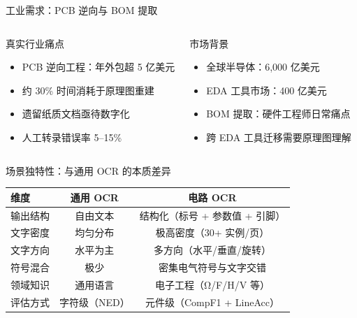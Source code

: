\documentclass[10pt,aspectratio=169,table]{beamer}
\begin{document}
\begin{frame}{工业需求：PCB 逆向与 BOM 提取}
  \begin{columns}[T]
      \begin{block}{真实行业痛点}
        \footnotesize
        \begin{itemize}
          \item PCB 逆向工程：年外包超 5 亿美元
          \item 约 30\% 时间消耗于原理图重建
          \item 遗留纸质文档亟待数字化
          \item 人工转录错误率 5--15\%
        \end{itemize}
      \end{block}
      \begin{block}{市场背景}
        \footnotesize
        \begin{itemize}
          \item 全球半导体：6,000 亿美元
          \item EDA 工具市场：400 亿美元
          \item BOM 提取：硬件工程师日常痛点
          \item 跨 EDA 工具迁移需要原理图理解
        \end{itemize}
      \end{block}
  \end{columns}
\end{frame}

\begin{frame}{场景独特性：与通用 OCR 的本质差异}
  \begin{table}
    \centering
    \scriptsize
    \begin{tabular}{lcc}
      \toprule
      \textbf{维度} & \textbf{通用 OCR} & \textbf{电路 OCR} \\
      \midrule
      输出结构 & 自由文本 & 结构化（标号 + 参数值 + 引脚） \\
      文字密度 & 均匀分布 & 极高密度（30+ 实例/页） \\
      文字方向 & 水平为主 & 多方向（水平/垂直/旋转） \\
      符号混合 & 极少 & 密集电气符号与文字交错 \\
      领域知识 & 通用语言 & 电子工程（Ω/F/H/V 等） \\
      评估方式 & 字符级（NED） & 元件级（CompF1 + LineAcc） \\
      \bottomrule
    \end{tabular}
  \end{table}
\end{frame}
\end{document}
